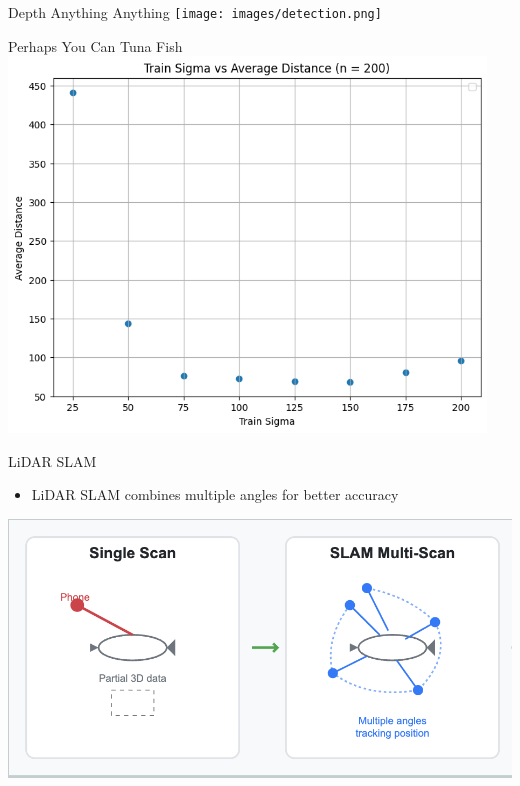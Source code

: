 \begin{frame}{Depth Anything Anything}
    \centering
    \texttt{[image: images/detection.png]}
\end{frame}

\begin{frame}{Perhaps You Can Tuna Fish}
    \centering
    \includegraphics[height=0.95\textheight,width=0.95\textwidth,keepaspectratio]{images/tuning.png}
\end{frame}

\begin{frame}{LiDAR SLAM}
    \begin{itemize}
        \item LiDAR SLAM combines multiple angles for better accuracy
    \end{itemize}

    \centering
    \includegraphics[height=0.7\textheight,keepaspectratio]{images/LiDAR SLAM.png}
\end{frame}


